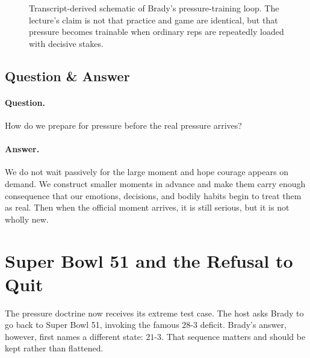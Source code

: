 \begin{figure}[h]
\centering
{}
\caption{Transcript-derived schematic of Brady's pressure-training loop. The lecture's claim is not that practice and game are identical, but that pressure becomes trainable when ordinary reps are repeatedly loaded with decisive stakes.}
\end{figure}

\subsection{Question \& Answer}

\paragraph{Question.} How do we prepare for pressure before the real pressure arrives?

\paragraph{Answer.} We do not wait passively for the large moment and hope courage appears on demand. We construct smaller moments in advance and make them carry enough consequence that our emotions, decisions, and bodily habits begin to treat them as real. Then when the official moment arrives, it is still serious, but it is not wholly new.

\section{Super Bowl 51 and the Refusal to Quit}

The pressure doctrine now receives its extreme test case. The host asks Brady to go back to Super Bowl 51, invoking the famous \(28\text{-}3\) deficit. Brady's answer, however, first names a different state: \(21\text{-}3\). That sequence matters and should be kept rather than flattened.

